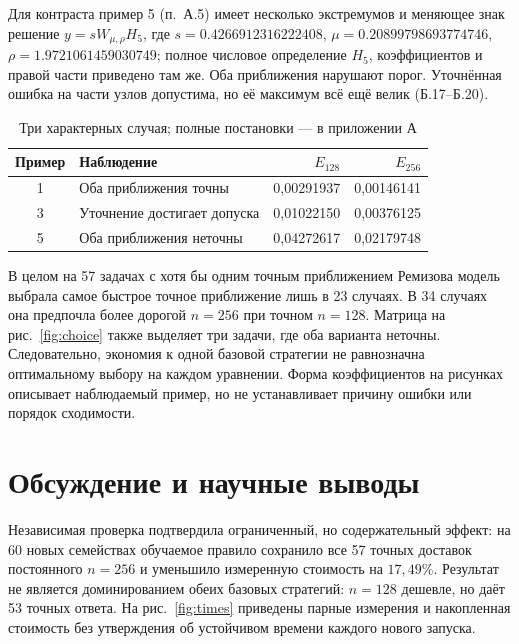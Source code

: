 Для контраста пример 5 (п.~А.5) имеет несколько экстремумов и меняющее знак решение $y=sW_{\mu,\rho}H_5$, где $s=0.4266912316222408$, $\mu=0.20899798693774746$, $\rho=1.9721061459030749$; полное числовое определение $H_5$, коэффициентов и правой части приведено там же. Оба приближения нарушают порог. Уточнённая ошибка на части узлов допустима, но её максимум всё ещё велик (Б.17--Б.20).
\begin{table}[!ht]\centering\caption{Три характерных случая; полные постановки --- в приложении А}\label{tab:cases}
\begin{tabular}{clrr}\toprule Пример&Наблюдение&$E_{128}$&$E_{256}$\\\midrule
1&Оба приближения точны&0,00291937&0,00146141\\
3&Уточнение достигает допуска&0,01022150&0,00376125\\
5&Оба приближения неточны&0,04272617&0,02179748\\\bottomrule\end{tabular}\end{table}

В целом на 57 задачах с хотя бы одним точным приближением Ремизова модель выбрала самое быстрое точное приближение лишь в 23 случаях. В 34 случаях она предпочла более дорогой $n=256$ при точном $n=128$. Матрица на рис.~\ref{fig:choice} также выделяет три задачи, где оба варианта неточны. Следовательно, экономия к одной базовой стратегии не равнозначна оптимальному выбору на каждом уравнении. Форма коэффициентов на рисунках описывает наблюдаемый пример, но не устанавливает причину ошибки или порядок сходимости.
\clearpage
{}
\section{Обсуждение и научные выводы}
Независимая проверка подтвердила ограниченный, но содержательный эффект: на 60 новых семействах обучаемое правило сохранило все 57 точных доставок постоянного $n=256$ и уменьшило измеренную стоимость на $17{,}49\%$. Результат не является доминированием обеих базовых стратегий: $n=128$ дешевле, но даёт 53 точных ответа. На рис.~\ref{fig:times} приведены парные измерения и накопленная стоимость без утверждения об устойчивом времени каждого нового запуска.

